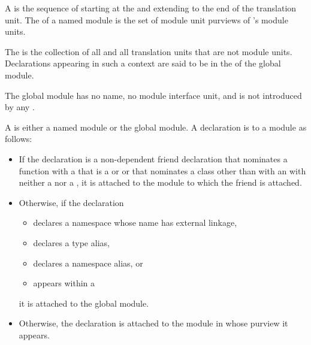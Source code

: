 \pnum
A  is
the sequence of 
starting at the 
and extending to the end of the translation unit.
The 
of a named module  is the set of module unit purviews
of 's module units.

\pnum
The  is the collection of all
and all translation units that are not module units.
Declarations appearing in such a context
are said to be in the  of the global module.
\begin{note}
The global module has no name, no module interface unit, and is not
introduced by any .
\end{note}

\pnum
A  is either a named module or the global module.
A declaration is  to a module as follows:
\begin{itemize}
\item
If the declaration is a non-dependent friend declaration
that nominates a function with a 
that is a  or  or
that nominates a class
other than with an  with neither
a  nor a ,
it is attached to the module to which the friend is attached.
\item Otherwise, if the declaration
\begin{itemize}
\item declares a namespace whose name has external linkage,
\item declares a type alias,
\item declares a namespace alias, or
\item appears within a 
\end{itemize}
it is attached to the global module.

\item Otherwise, the declaration is
attached to the module in whose purview it appears.
\end{itemize}

